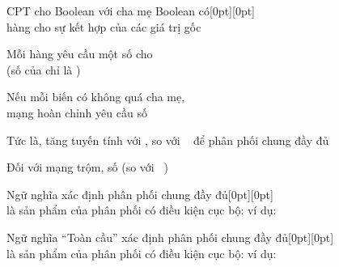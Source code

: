 \documentclass{article}
\begin{document}
\begin{huge}

\vspace*{0.3in}

\textwidth
{}


CPT cho Boolean  với  cha mẹ Boolean có\hspace*{1.75in}\epsfxsize=1.5in\raisebox{-1.5in}[0pt][0pt]{}\\
 hàng cho sự kết hợp của các giá trị gốc

Mỗi hàng yêu cầu một số  cho \\
(số của  chỉ là )

Nếu mỗi biến có không quá  cha mẹ, \\
mạng hoàn chỉnh yêu cầu số 

Tức là, tăng tuyến tính với , so với ~ để phân phối chung đầy đủ

Đối với mạng trộm, số  (so với ~)


Ngữ nghĩa  xác định phân phối chung đầy đủ\hspace*{1.2in}\epsfxsize=1.5in\raisebox{-1.5in}[0pt][0pt]{}\\
là sản phẩm của phân phối có điều kiện cục bộ:
\mat{\[
  P(x_1,\ldots,x_n) = \myprod_{i\eq 1}^n P(x_i|\parents(X_i))
\]}
ví dụ: 
\mat{\[
  =
\]}



Ngữ nghĩa ``Toàn cầu'' xác định phân phối chung đầy đủ\hspace*{1.2in}\epsfxsize=1.5in\raisebox{-1.5in}[0pt][0pt]{}\\
là sản phẩm của phân phối có điều kiện cục bộ:
\mat{\[
  P(x_1,\ldots,x_n) = \myprod_{i\eq 1}^n P(x_i|\parents(X_i))
\]}
ví dụ:  


\end{huge}
\end{document}
